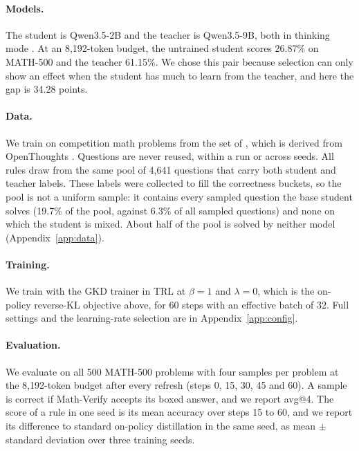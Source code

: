 \documentclass[11pt]{article}
\begin{document}
\paragraph{Models.}
The student is Qwen3.5-2B and the teacher is Qwen3.5-9B, both in thinking mode \citep{qwen2026qwen35_2b,qwen2026qwen35_9b}.
At an 8,192-token budget, the untrained student scores 26.87\% on MATH-500 and the teacher 61.15\%.
We chose this pair because selection can only show an effect when the student has much to learn from the teacher, and here the gap is 34.28 points.

\paragraph{Data.}
We train on competition math problems from the set of \citet{zhao2026openthoughtsdata}, which is derived from OpenThoughts \citep{guha2025openthoughts}.
Questions are never reused, within a run or across seeds.
All rules draw from the same pool of 4,641 questions that carry both student and teacher labels.
These labels were collected to fill the correctness buckets, so the pool is not a uniform sample: it contains every sampled question the base student solves (19.7\% of the pool, against 6.3\% of all sampled questions) and none on which the student is mixed.
About half of the pool is solved by neither model (Appendix~\ref{app:data}).

\paragraph{Training.}
We train with the GKD trainer in TRL \citep{vonwerra2020trl} at $\beta = 1$ and $\lambda = 0$, which is the on-policy reverse-KL objective above, for 60 steps with an effective batch of 32.
Full settings and the learning-rate selection are in Appendix~\ref{app:config}.

\paragraph{Evaluation.}
We evaluate on all 500 MATH-500 problems \citep{hendrycks2021math,lightman2023verify} with four samples per problem at the 8,192-token budget after every refresh (steps 0, 15, 30, 45 and 60).
A sample is correct if Math-Verify \citep{kydlicek2025mathverify} accepts its boxed answer, and we report avg@4.
The score of a rule in one seed is its mean accuracy over steps 15 to 60, and we report its difference to standard on-policy distillation in the same seed, as mean $\pm$ standard deviation over three training seeds.
\end{document}
